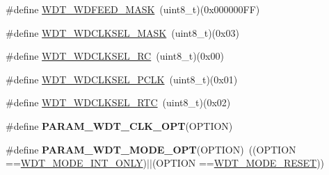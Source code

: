 \begin{DoxyCompactItemize}
$$\item 
\#define \hyperlink{group___w_d_t___private___macros_ga97f7497625117ed08fb8796f16a3869c}{\-W\-D\-T\-\_\-\-W\-D\-F\-E\-E\-D\-\_\-\-M\-A\-S\-K}~(uint8\-\_\-t)(0x000000\-F\-F)
\item 
\#define \hyperlink{group___w_d_t___private___macros_ga25bccb79169e6c2dc93d1a2fd4828957}{\-W\-D\-T\-\_\-\-W\-D\-C\-L\-K\-S\-E\-L\-\_\-\-M\-A\-S\-K}~(uint8\-\_\-t)(0x03)
\item 
\#define \hyperlink{group___w_d_t___private___macros_ga7a773644003e35c52c0ae06bf01671d1}{\-W\-D\-T\-\_\-\-W\-D\-C\-L\-K\-S\-E\-L\-\_\-\-R\-C}~(uint8\-\_\-t)(0x00)
\item 
\#define \hyperlink{group___w_d_t___private___macros_ga57d8247c4f86d49240666c9dd1dedfa4}{\-W\-D\-T\-\_\-\-W\-D\-C\-L\-K\-S\-E\-L\-\_\-\-P\-C\-L\-K}~(uint8\-\_\-t)(0x01)
\item 
\#define \hyperlink{group___w_d_t___private___macros_ga42a61bebca9f24c35621b354a522aa08}{\-W\-D\-T\-\_\-\-W\-D\-C\-L\-K\-S\-E\-L\-\_\-\-R\-T\-C}~(uint8\-\_\-t)(0x02)
\item 
\#define {\bfseries \-P\-A\-R\-A\-M\-\_\-\-W\-D\-T\-\_\-\-C\-L\-K\-\_\-\-O\-P\-T}(\-O\-P\-T\-I\-O\-N)
\item 
\hypertarget{group___w_d_t___private___macros_ga1993bac6d35785d3909ff28d4828eede}{\#define {\bfseries \-P\-A\-R\-A\-M\-\_\-\-W\-D\-T\-\_\-\-M\-O\-D\-E\-\_\-\-O\-P\-T}(\-O\-P\-T\-I\-O\-N)~((\-O\-P\-T\-I\-O\-N ==\hyperlink{group___w_d_t___public___types_gga9bef6b40714143d8ce7a190d387801fca1e1dfb30a3aab5a6cbd979a663ab465e}{\-W\-D\-T\-\_\-\-M\-O\-D\-E\-\_\-\-I\-N\-T\-\_\-\-O\-N\-L\-Y})$|$$|$(\-O\-P\-T\-I\-O\-N ==\hyperlink{group___w_d_t___public___types_gga9bef6b40714143d8ce7a190d387801fca6c9b4ba8bd7850dcd11ff2fd27f453ac}{\-W\-D\-T\-\_\-\-M\-O\-D\-E\-\_\-\-R\-E\-S\-E\-T}))}\label{group___w_d_t___private___macros_ga1993bac6d35785d3909ff28d4828eede}

\end{DoxyCompactItemize}


